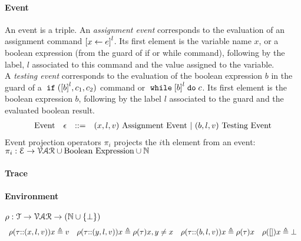 \paragraph*{Event}
An event is a triple.
An \emph{assignment event} corresponds to the evaluation of an assignment command $\clabel{\assign{x}{\expr}}^l$.
Its first element is the variable name $x$,
or a boolean expression (from the guard of if or while command), 
following by 
 the label, $l$ associated to this command and the value assigned to the variable.
 \\
 A \emph{testing event} corresponds to the evaluation of the boolean expression $b$ in the guard of a $\eif(\clabel{b}^l, c_1, c_2)$ command or $\ewhile \clabel{b}^l \edo c$.
 Its first element is the boolean expression $b$, following by 
 the label $l$ associated to the guard and the evaluated boolean result.
%
\[
\begin{array}{llll}
  \mbox{Event} 
  & \mathtt{\epsilon} & ::= & 
  ({x}, l, v) ~ \mbox{Assignment Event} 
  ~|~(b, l, v) ~ \mbox{Testing Event}
\end{array}
\]
Event projection operators $\pi_i$ projects the $i$th element from an event: 
\\
$\pi_i : 
\mathcal{E} \to \mathcal{VAR}\cup \mbox{Boolean Expression}  \cup \mathbb{N} $
\paragraph*{Trace}

%
\paragraph{Environment} $ \rho : {\mathcal{T}}  \to \mathcal{VAR} \to( \mathbb{N} \cup \{\bot\})$
\[
\begin{array}{llll}
\rho(\mathtt{\tau}  {\small ::} (x, l, v)) x \triangleq v
&
\rho(\mathtt{\tau} {\small ::} (y, l, v)) x \triangleq \rho(\mathtt{\tau}) x, y \neq x
&
\rho(\mathtt{\tau} {\small ::} (b, l, v)) x \triangleq \rho(\mathtt{\tau}) x
&
\rho({[]} ) x \triangleq \bot
\end{array}
\]
